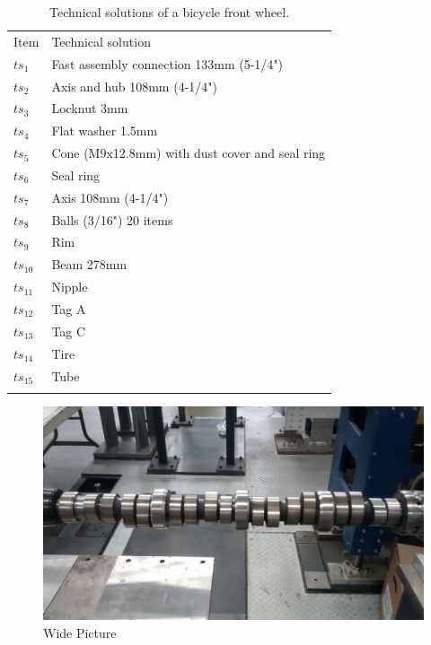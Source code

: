 \documentclass[fleqn,10pt]{AmateCodex} %
\begin{document}
\begin{table}[t]
\caption{Technical solutions of a bicycle front wheel.}  
\begin{center}
\label{TSwell}
  \begin{tabular}{lp{6cm}}
\hline\noalign{\smallskip}
Item & Technical solution\\
\noalign{\smallskip}\hline\noalign{\smallskip}
$ts_1$ & Fast assembly connection 133mm (5-1/4") \\
$ts_2$ & Axis and hub 108mm (4-1/4")\\
$ts_3$ & Locknut 3mm\\
$ts_4$ & Flat washer 1.5mm\\
$ts_5$ & Cone (M9x12.8mm) with dust cover and seal ring\\
$ts_6$ & Seal ring\\
$ts_7$ & Axis 108mm (4-1/4")\\
$ts_8$ & Balls (3/16") 20 items\\
$ts_9$ & Rim\\
$ts_{10}$ & Beam 278mm\\
$ts_{11}$ & Nipple\\
$ts_{12}$ & Tag A\\
$ts_{13}$ & Tag C\\
$ts_{14}$ & Tire\\
$ts_{15}$ & Tube\\
\noalign{\smallskip}\hline
\end{tabular}
    \end{center}
\end{table}

\begin{figure}[ht]\centering %
\includegraphics[width=\linewidth]{imagenes/view02.jpg}
\caption{Wide Picture}
\label{fig:view}
\end{figure}
\end{document}
